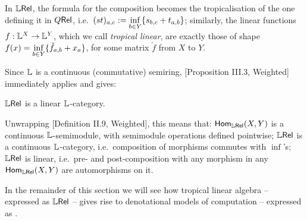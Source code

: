 \begin{remark}
 In $\mathbb{L} \mathsf{Rel}$, the formula for the composition becomes the tropicalisation of the one defining it in $Q \mathsf{Rel}$, i.e.\ $(st)_{a,c}:=\inf\limits_{b\in Y}\{s_{b,c}+t_{a,b}\}$;
 similarly, the linear functions $f:\mathbb{L}^X\to \mathbb{L}^Y$, which we call \emph{tropical linear}, are exactly those of shape $f(x)=\inf\limits_{b\in Y} \{\check f_{a,b}+x_a\}$, for some matrix $\check f$ from $X$ to $Y$.
\end{remark}

Since $\mathbb{L}$ is a continuous (commutative) semiring, [Proposition III.3, Weighted] immediately applies and gives:

\begin{fact}
 $\mathbb{L} \mathsf{Rel}$ is a linear $\mathbb{L}$-category.
\end{fact}

Unwrapping [Definition II.9, Weighted], this means that:
$\mathsf{Hom}_{\mathbb{L} \mathsf{Rel}}(X,Y)$ is a continuous $\mathbb{L}$-semimodule, with semimodule operations defined pointwise;
$\mathbb{L} \mathsf{Rel}$ is a continuous $\mathbb{L}$-category, i.e.\ composition of morphisms commutes with $\inf$'s;
$\mathbb{L} \mathsf{Rel}$ is linear, i.e.\ pre- and post-composition with any morphism in any $\mathsf{Hom}_{\mathbb{L} \mathsf{Rel}}(X,Y)$ are automorphisms on it.

In the remainder of this section we will see how tropical linear algebra -- expressed as $\mathbb{L} \mathsf{Rel}$ -- gives rise to denotational models of computation -- expressed as \lamcalc.
